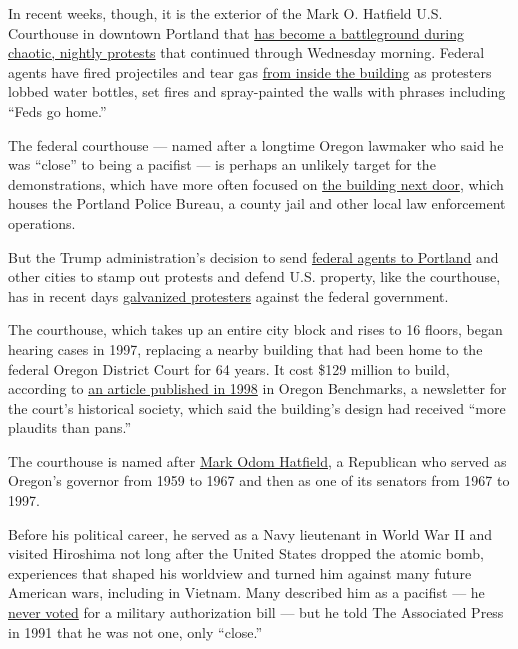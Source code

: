 In recent weeks, though, it is the exterior of the Mark O. Hatfield U.S.
Courthouse in downtown Portland that
\href{https://www.nytimes3xbfgragh.onion/2020/07/21/us/portland-protests.html}{has
become a battleground during chaotic, nightly protests} that continued
through Wednesday morning. Federal agents have fired projectiles and
tear gas
\href{https://twitter.com/ByMikeBaker/status/1285490693486473216?s=20}{from
inside the building} as protesters lobbed water bottles, set fires and
spray-painted the walls with phrases including ``Feds go home.''

The federal courthouse --- named after a longtime Oregon lawmaker who
said he was ``close'' to being a pacifist --- is perhaps an unlikely
target for the demonstrations, which have more often focused on
\href{https://www.oregonlive.com/news/2020/06/portlands-justice-center-fence-a-daunting-place-after-dark-for-both-protesters-and-police.html}{the
building next door}, which houses the Portland Police Bureau, a county
jail and other local law enforcement operations.

But the Trump administration's decision to send
\href{https://www.nytimes3xbfgragh.onion/2020/07/29/us/protests-portland-federal-withdrawal.html}{federal
agents to Portland} and other cities to stamp out protests and defend
U.S. property, like the courthouse, has in recent days
\href{https://www.nytimes3xbfgragh.onion/2020/07/20/us/portland-protests-navy-christopher-david.html}{galvanized
protesters} against the federal government.

The courthouse, which takes up an entire city block and rises to 16
floors, began hearing cases in 1997, replacing a nearby building that
had been home to the federal Oregon District Court for 64 years. It cost
\$129 million to build, according to
\href{https://usdchs.org/wp-content/uploads/2020/03/1998-Spring-Oregon-Benchmarks.pdf}{an
article published in 1998} in Oregon Benchmarks, a newsletter for the
court's historical society, which said the building's design had
received ``more plaudits than pans.''

The courthouse is named after
\href{https://www.nytimes3xbfgragh.onion/2011/08/08/us/politics/08hatfield.html}{Mark
Odom Hatfield}, a Republican who served as Oregon's governor from 1959
to 1967 and then as one of its senators from 1967 to 1997.

Before his political career, he served as a Navy lieutenant in World War
II and visited Hiroshima not long after the United States dropped the
atomic bomb, experiences that shaped his worldview and turned him
against many future American wars, including in Vietnam. Many described
him as a pacifist --- he
\href{https://www.senate.gov/senators/FeaturedBios/Featured_Bio_HatfieldMark.htm}{never
voted} for a military authorization bill --- but he told The Associated
Press in 1991 that he was not one, only ``close.''

